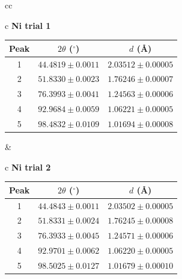 \documentclass[12pt]{article}
\begin{document}
\begin{table}[H]
\centering
\label{tab:XRD_results}
\renewcommand{\arraystretch}{1.1}
\setlength{\tabcolsep}{5pt}

\begin{tabular}{cc}

\begin{tabular}{c}
\textbf{Ni trial 1}\\[-2pt]
\begin{tabular}{ccc}
\hline
Peak & $2\theta$ ($^\circ$) & $d$ (\AA)\\
\hline
1 & $44.4819 \pm 0.0011$ & $2.03512 \pm 0.00005$\\
2 & $51.8330 \pm 0.0023$ & $1.76246 \pm 0.00007$\\
3 & $76.3993 \pm 0.0041$ & $1.24563 \pm 0.00006$\\
4 & $92.9684 \pm 0.0059$ & $1.06221 \pm 0.00005$\\
5 & $98.4832 \pm 0.0109$ & $1.01694 \pm 0.00008$\\
\hline
\end{tabular}
\end{tabular}
&
\begin{tabular}{c}
\textbf{Ni trial 2}\\[-2pt]
\begin{tabular}{ccc}
\hline
Peak & $2\theta$ ($^\circ$) & $d$ (\AA)\\
\hline
1 & $44.4843 \pm 0.0011$ & $2.03502 \pm 0.00005$\\
2 & $51.8331 \pm 0.0024$ & $1.76245 \pm 0.00008$\\
3 & $76.3933 \pm 0.0045$ & $1.24571 \pm 0.00006$\\
4 & $92.9701 \pm 0.0062$ & $1.06220 \pm 0.00005$\\
5 & $98.5025 \pm 0.0127$ & $1.01679 \pm 0.00010$\\
\hline
\end{tabular}
\end{tabular}
\\[8pt]


\end{tabular}
\end{table}
\end{document}
